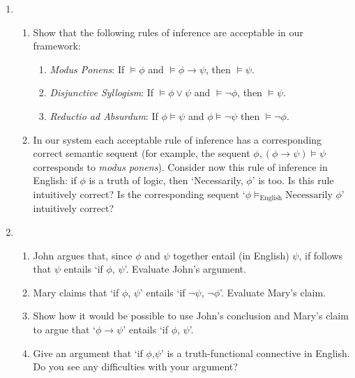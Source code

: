 {\begin{enumerate}
	\item 	\begin{enumerate} \item Show that the following rules of inference are acceptable in our framework: \begin{enumerate}
		\item \emph{Modus Ponens}: If $\vDash \phi$ and $\vDash \phi \to \psi$, then $\vDash \psi$.
				\item \emph{Disjunctive Syllogism}: If $\vDash \phi \vee \psi$ and $\vDash \neg \phi$, then $\vDash \psi$.
				\item \emph{Reductio ad Absurdum}: If $\phi \vDash \psi$ and $\phi \vDash \neg \psi$ then $\vDash \neg \phi$. \end{enumerate}
	\item
		 In our system each acceptable rule of inference has a corresponding correct semantic sequent (for example, the sequent $\phi, (\phi \to \psi) \vDash \psi$ corresponds to  \emph{modus ponens}). Consider now this rule of inference in English: if $\phi$ is a truth of logic, then `Necessarily, $\phi$' is too.  Is this rule intuitively correct? Is the corresponding sequent `$\phi \vDash_{\text{English}} \text{Necessarily } \phi$' intuitively correct?
		\end{enumerate}

		\item \begin {enumerate} \item John argues that, since $\phi$ and $\psi$ together entail (in English)
		$\psi$, if follows that $\psi$ entails `if $\phi$, $\psi$'. Evaluate John's argument.

		\item Mary claims that `if $\phi$, $\psi$' entails `if $\neg \psi$, $\neg
		\phi$'. Evaluate Mary's claim.
		\item Show how it would be possible to use John's conclusion and
		Mary's claim to argue that `$\phi \to \psi$' entails `if $\phi$,
		$\psi$'.
		\item Give an argument that `if $\phi$,$\psi$' is a truth-functional connective in English. Do you see any difficulties with your argument?

		\end{enumerate}	
	

\end{enumerate}}
